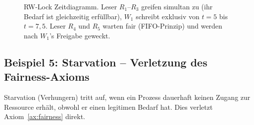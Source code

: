 ﻿\documentclass[a4paper,12pt]{article}
\theoremstyle{definition}
\begin{document}
\begin{figure}[H]
\begin{tikzpicture}
\end{tikzpicture}
\caption{RW-Lock Zeitdiagramm. Leser $R_1$--$R_3$ greifen simultan zu
  (ihr Bedarf ist gleichzeitig erfüllbar), $W_1$ schreibt exklusiv
  von $t=5$ bis $t=7{,}5$. Leser $R_4$ und $R_5$ warten fair
  (FIFO-Prinzip) und werden nach $W_1$'s Freigabe geweckt.}
\label{fig:tikz4}
\end{figure}

\subsection{Beispiel 5: Starvation -- Verletzung des Fairness-Axioms}

Starvation (Verhungern) tritt auf, wenn ein Prozess dauerhaft
keinen Zugang zur Ressource erhält, obwohl er einen legitimen Bedarf hat.
Dies verletzt Axiom~\ref{ax:fairness} direkt.
\end{document}
